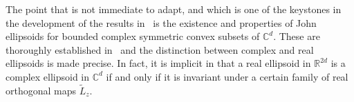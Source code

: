 \documentclass{article}
\theoremstyle{definition}
\theoremstyle{remark}
\numberwithin{equation}{section}
\newcommand{\reals}{\mathbb{R}}
\newcommand{\complex}{\mathbb{C}}
\newcommand{\1}{\mathbf{1}}
\newcommand{\matrices}[2]{\mathrm{M}_{{#1}}({#2})}
\begin{document}


    The point that is not immediate to adapt, and which is one of the keystones in the development of the results in~\cite{Cruz_Uribe_Bownik_Extrapolation} is the existence and properties of John ellipsoids for bounded complex symmetric convex subsets of $\complex^d$. These are thoroughly established in~\cite[Appendix~A]{DKPS2024} and the distinction between complex and real ellipsoids is made precise.  In fact, it is implicit in \cite[Subsection~A.4.7]{DKPS2024} that a real ellipsoid in $\reals^{2d}$ is a complex ellipsoid in $\complex^d$ if and only if it is invariant under a certain family of real orthogonal maps $\widetilde{L}_{z}.$
\end{document}
